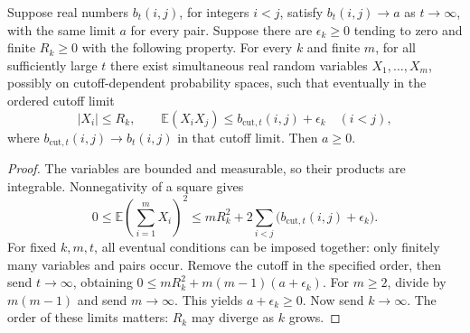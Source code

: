 \begin{lemma}
\label{ex-replicated-positivity}
Suppose real numbers \(b_t(i,j)\), for integers \(i<j\), satisfy
\(b_t(i,j)\to a\) as \(t\to\infty\), with the same limit \(a\)
for every pair. Suppose there are \(\epsilon_k\ge0\) tending to zero
and finite \(R_k\ge0\) with the following property. For every \(k\)
and finite \(m\), for all sufficiently large \(t\) there exist
simultaneous real random variables \(X_1,\ldots,X_m\), possibly on
cutoff-dependent probability spaces, such that eventually in the ordered
cutoff limit
\[
 |X_i|\le R_k,\qquad
 \mathbb E(X_iX_j)\le b_{\mathrm{cut},t}(i,j)+\epsilon_k
 \quad(i<j),
\]
where \(b_{\mathrm{cut},t}(i,j)\to b_t(i,j)\) in that cutoff limit.
Then \(a\ge0\).
\end{lemma}
\begin{proof}
The variables are bounded and measurable, so their products are integrable.
Nonnegativity of a square gives
\[
 0\le\mathbb E\left(\sum_{i=1}^mX_i\right)^2
 \le mR_k^2+2\sum_{i<j}
       \bigl(b_{\mathrm{cut},t}(i,j)+\epsilon_k\bigr).
\]
For fixed \(k,m,t\), all eventual conditions can be imposed together:
only finitely many variables and pairs occur. Remove the cutoff in the
specified order, then send \(t\to\infty\), obtaining
\(0\le mR_k^2+m(m-1)(a+\epsilon_k)\).
For \(m\ge2\), divide by \(m(m-1)\) and send \(m\to\infty\).
This yields \(a+\epsilon_k\ge0\). Now send \(k\to\infty\).
The order of these limits matters: \(R_k\) may diverge as \(k\) grows.
\end{proof}

